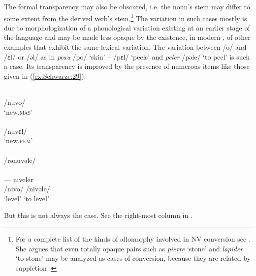 \documentclass[output=paper]{langsci/langscibook}
\begin{document}
The formal transparency may also be obscured, i.e. the noun's stem may differ to some extent from the derived verb's stem.\footnote{For a complete list of the kinds of allomorphy involved in N\textrightarrow{}V conversion see %
\citet[114f]{Tribout2010a}%
%
%
. She argues that even totally opaque pairs such as \emph{pierre} `stone' and \emph{lapider} `to stone' may be analyzed as cases of conversion, because they are related by suppletion %
\citep[110, 118]{Tribout2010a}%
%
.} The variation in such cases mostly is due to morphologization of a phonological variation existing at an earlier stage of the language and may be made less opaque by the existence, in modern , of other examples that exhibit the same lexical variation. The variation between /o/ and /ɛl/ or /ǝl/ as in
\emph{peau} /po/ `skin' -- /pɛl/ `peels' and \emph{peler} /pǝle/ `to peel' is such a case. Its transparency is improved by the presence of numerous items like those given in (\ref{ex:Schwarze:29}):

\ea \label{ex:Schwarze:29}
\ea {}\\
          /nuvo/\\
          {`new.\textsc{mas}'}\\
\ex {}\\
          /nuvɛl/\\
          {`new.\textsc{fem}'}\\
\ex {}\\
          /rǝnuvǝle/\\
    \\
\ex {} --- {niveler}\\
          /nivo/ {} /nivǝle/\\
          `level' {} {`to level'}\\
\z\z

\newpage 
But this is not always the case. See the right-most column in .
\end{document}

